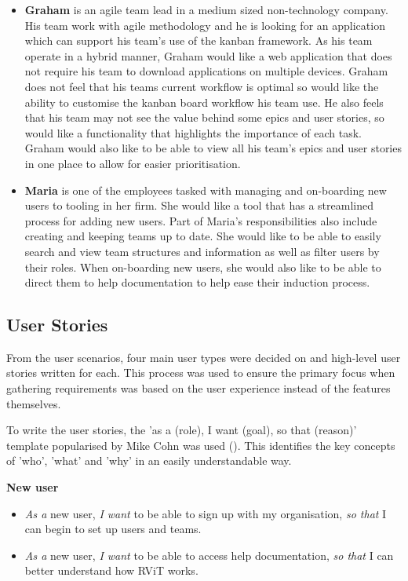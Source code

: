 \documentclass[l4proj.tex]{subfiles}
\begin{document}
\begin{itemize}
    \item \textbf{Graham} is an agile team lead in a medium sized non-technology company. His team work with agile methodology and he is looking for an application which can support his team's use of the kanban framework. As his team operate in a hybrid manner, Graham would like a web application that does not require his team to download applications on multiple devices. Graham does not feel that his teams current workflow is optimal so would like the ability to customise the kanban board workflow his team use. He also feels that his team may not see the value behind some epics and user stories, so would like a functionality that highlights the importance of each task. Graham would also like to be able to view all his team's epics and user stories in one place to allow for easier prioritisation. \\

    \item \textbf{Maria} is one of the employees tasked with managing and on-boarding new users to tooling in her firm. She would like a tool that has a streamlined process for adding new users. Part of Maria's responsibilities also include creating and keeping teams up to date. She would like to be able to easily search and view team structures and information as well as filter users by their roles. When on-boarding new users, she would also like to be able to direct them to help documentation to help ease their induction process. 
\end{itemize}

\subsection{User Stories}
From the user scenarios, four main user types were decided on and high-level user stories written for each. This process was used to ensure the primary focus when gathering requirements was based on the user experience instead of the features themselves. 

To write the user stories, the 'as a (role), I want (goal), so that (reason)' template popularised by Mike Cohn was used (\cite{Cohn}). This identifies the key concepts of 'who', 'what' and 'why' in an easily understandable way. 


\textbf{New user}
\begin{itemize}
    \item \textit{As a} new user, \textit{I want} to be able to sign up with my organisation, \textit{so that} I can begin to set up users and teams.
    \item \textit{As a} new user, \textit{I want} to be able to access help documentation, \textit{so that} I can better understand how RViT works.
\end{itemize}
\end{document}
